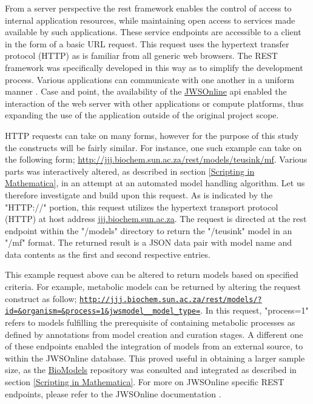 From a server perspective the \gls{rest} framework enables the control of access to internal application resources, while maintaining open access to services made available by such applications. These service endpoints are accessible to a client in the form of a basic URL request. This request uses the hypertext transfer protocol (HTTP) as is familiar from all generic web browsers. The REST framework was specifically developed in this way as to simplify the development process. Various applications can communicate with one another in a uniform manner \cite{rest2018}. Case and point, the availability of the \href{http://jjj.biochem.sun.ac.za}{JWSOnline} \gls{api} enabled the interaction of the web server with other applications or compute platforms, thus expanding the use of the application outside of the original project scope. 

HTTP requests can take on many forms, however for the purpose of this study the constructs will be fairly similar. For instance, one such example can take on the following form; \href{http://jjj.biochem.sun.ac.za/rest/models/teusink/mf}{http://jjj.biochem.sun.ac.za/rest/models/teusink/mf}. Various parts was interactively altered, as described in section \ref{Scripting in Mathematica}, in an attempt at an automated model handling algorithm. Let us therefore investigate and build upon this request. As is indicated by the "HTTP://" portion, this request utilizes the hypertext transport protocol (HTTP) at host address \href{jjj.biochem.sun.ac.za}{jjj.biochem.sun.ac.za}. The request is directed at the \gls{rest} endpoint within the "/models" directory to return the "/teusink" model in an "/mf" format. The returned result is a JSON data pair with model name and data contents as the first and second respective entries.

This example request above can be altered to return models based on specified criteria. For example, metabolic models can be returned by altering the request construct as follow; \href{http://jjj.biochem.sun.ac.za/rest/models/?id=&organism=&process=1&jwsmodel__model_type=}{\nolinkurl{http://jjj.biochem.sun.ac.za/rest/models/?id=\&organism=\&process=1\&jwsmodel\_\_model\_type=}}. In this request, "process=1" refers to models fulfilling the prerequisite of containing metabolic processes as defined by annotations from model creation and curation stages. A different one of these endpoints enabled the integration of models from an external source, to within the JWSOnline database. This proved useful in obtaining a larger sample size, as the \href{https://www.ebi.ac.uk/biomodels-main/}{BioModels} repository was consulted and integrated as described in section \ref{Scripting in Mathematica}. For more on JWSOnline specific REST endpoints, please refer to the JWSOnline documentation \cite{jwsdocs}. 

